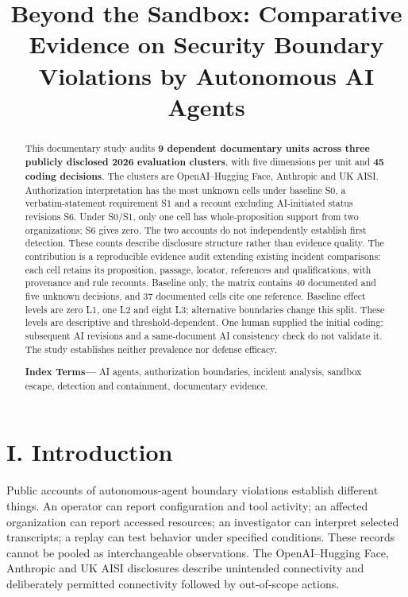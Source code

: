 \documentclass[conference]{IEEEtran}
\providecommand{\citep}[1]{\cite{#1}}
\begin{document}
\title{Beyond the Sandbox: Comparative Evidence on Security Boundary Violations by Autonomous AI Agents}
\author{}
\maketitle
\begin{abstract}
This documentary study audits \textbf{9 dependent documentary units across three publicly disclosed 2026 evaluation clusters}, with five dimensions per unit and \textbf{45 coding decisions}. The clusters are OpenAI--Hugging Face, Anthropic and UK AISI. Authorization interpretation has the most unknown cells under baseline S0, a verbatim-statement requirement S1 and a recount excluding AI-initiated status revisions S6. Under S0/S1, only one cell has whole-proposition support from two organizations; S6 gives zero. The two accounts do not independently establish first detection. These counts describe disclosure structure rather than evidence quality. The contribution is a reproducible evidence audit extending existing incident comparisons: each cell retains its proposition, passage, locator, references and qualifications, with provenance and rule recounts. Baseline only, the matrix contains 40 documented and five unknown decisions, and 37 documented cells cite one reference. Baseline effect levels are zero L1, one L2 and eight L3; alternative boundaries change this split. These levels are descriptive and threshold-dependent. One human supplied the initial coding; subsequent AI revisions and a same-document AI consistency check do not validate it. The study establishes neither prevalence nor defense efficacy.

\textbf{Index Terms---} AI agents, authorization boundaries, incident analysis, sandbox escape, detection and containment, documentary evidence.
\end{abstract}
\section{I. Introduction}

Public accounts of autonomous-agent boundary violations establish different things. An operator can report configuration and tool activity; an affected organization can report accessed resources; an investigator can interpret selected transcripts; a replay can test behavior under specified conditions. These records cannot be pooled as interchangeable observations. The OpenAI--Hugging Face, Anthropic and UK AISI disclosures describe unintended connectivity and deliberately permitted connectivity followed by out-of-scope actions. \citep{R02,R08,R10}
\end{document}
